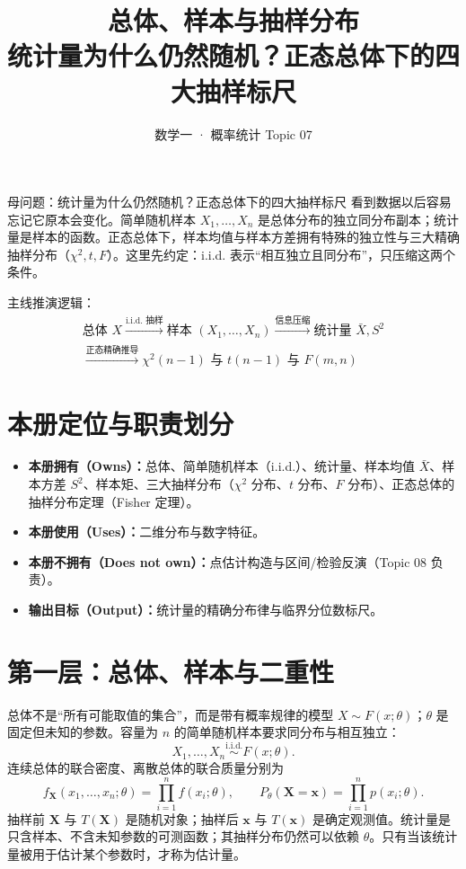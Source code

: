 \documentclass[11pt,a4paper]{ctexart}
\title{\vspace{-1.1cm}\textbf{总体、样本与抽样分布}\\[0.4em]
\large 统计量为什么仍然随机？正态总体下的四大抽样标尺}
\author{数学一 · 概率统计 Topic 07}
\date{}
\newcommand{\kw}[1]{\textbf{\color{deep}#1}}
\begin{document}
\maketitle

\begin{corebox}{母问题：统计量为什么仍然随机？正态总体下的四大抽样标尺}
看到数据以后容易忘记它原本会变化。简单随机样本 $X_1,\dots,X_n$ 是总体分布的独立同分布副本；统计量是样本的函数。正态总体下，样本均值与样本方差拥有特殊的独立性与三大精确抽样分布（$\chi^2, t, F$）。这里先约定：i.i.d. 表示“相互独立且同分布”，只压缩这两个条件。

主线推演逻辑：
\[
\boxed{
\begin{gathered}
\text{总体 } X \xrightarrow{\text{i.i.d. 抽样}} \text{样本 } (X_1,\dots,X_n) \xrightarrow{\text{信息压缩}} \text{统计量 } \bar X, S^2\\
\xrightarrow{\text{正态精确推导}} \chi^2(n-1) \text{ 与 } t(n-1) \text{ 与 } F(m,n)
\end{gathered}
}
\]
\end{corebox}

\section{本册定位与职责划分}

\begin{itemize}
  \item \kw{本册拥有（Owns）：}总体、简单随机样本（i.i.d.）、统计量、样本均值 $\bar X$、样本方差 $S^2$、样本矩、三大抽样分布（$\chi^2$ 分布、$t$ 分布、$F$ 分布）、正态总体的抽样分布定理（Fisher 定理）。
  \item \kw{本册使用（Uses）：}二维分布与数字特征。
  \item \kw{本册不拥有（Does not own）：}点估计构造与区间/检验反演（Topic 08 负责）。
  \item \kw{输出目标（Output）：}统计量的精确分布律与临界分位数标尺。
\end{itemize}

\section{第一层：总体、样本与二重性}

总体不是“所有可能取值的集合”，而是带有概率规律的模型 $X\sim F(x;\theta)$；$\theta$ 是固定但未知的参数。容量为 $n$ 的简单随机样本要求同分布与相互独立：
\[
X_1,\ldots,X_n\overset{\mathrm{i.i.d.}}{\sim}F(x;\theta).
\]
连续总体的联合密度、离散总体的联合质量分别为
\[
f_{\boldsymbol X}(x_1,\ldots,x_n;\theta)=\prod_{i=1}^nf(x_i;\theta),\qquad
P_\theta(\boldsymbol X=\boldsymbol x)=\prod_{i=1}^np(x_i;\theta).
\]
抽样前 $\boldsymbol X$ 与 $T(\boldsymbol X)$ 是随机对象；抽样后 $\boldsymbol x$ 与 $T(\boldsymbol x)$ 是确定观测值。统计量是只含样本、不含未知参数的可测函数；其抽样分布仍然可以依赖 $\theta$。只有当该统计量被用于估计某个参数时，才称为估计量。
\end{document}
